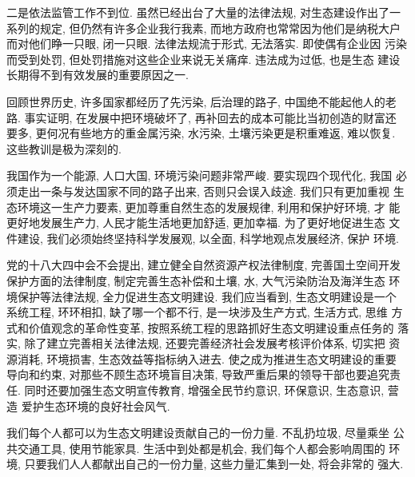 \documentclass[nofonts, a4paper, oneside, 12pt]{article}
\begin{document}
二是依法监管工作不到位. 虽然已经出台了大量的法律法规, 对生态建设作出了一
系列的规定, 但仍然有许多企业我行我素, 而地方政府也常常因为他们是纳税大户
而对他们睁一只眼, 闭一只眼. 法律法规流于形式, 无法落实. 即使偶有企业因
污染而受到处罚, 但处罚措施对这些企业来说无关痛痒. 违法成为过低, 也是生态
建设长期得不到有效发展的重要原因之一.

回顾世界历史, 许多国家都经历了先污染, 后治理的路子, 中国绝不能起他人的老
路. 事实证明, 在发展中把环境破坏了, 再补回去的成本可能比当初创造的财富还
要多, 更何况有些地方的重金属污染, 水污染, 土壤污染更是积重难返, 难以恢复.
这些教训是极为深刻的.

我国作为一个能源, 人口大国, 环境污染问题非常严峻. 要实现四个现代化, 我国 
必须走出一条与发达国家不同的路子出来, 否则只会误入歧途. 我们只有更加重视
生态环境这一生产力要素, 更加尊重自然生态的发展规律, 利用和保护好环境, 才
能更好地发展生产力, 人民才能生活地更加舒适, 更加幸福. 为了更好地促进生态
文件建设, 我们必须始终坚持科学发展观, 以全面, 科学地观点发展经济, 保护
环境. 

党的十八大四中会不会提出, 建立健全自然资源产权法律制度, 完善国土空间开发
保护方面的法律制度, 制定完善生态补偿和土壤, 水, 大气污染防治及海洋生态
环境保护等法律法规, 全力促进生态文明建设. 我们应当看到, 生态文明建设是一个
系统工程, 环环相扣, 缺了哪一个都不行, 是一块涉及生产方式, 生活方式, 思维
方式和价值观念的革命性变革, 按照系统工程的思路抓好生态文明建设重点任务的
落实, 除了建立完善相关法律法规, 还要完善经济社会发展考核评价体系, 切实把
资源消耗, 环境损害, 生态效益等指标纳入进去. 使之成为推进生态文明建设的重要
导向和约束, 对那些不顾生态环境盲目决策, 导致严重后果的领导干部也要追究责任.
同时还要加强生态文明宣传教育, 增强全民节约意识, 环保意识, 生态意识, 营造
爱护生态环境的良好社会风气.

我们每个人都可以为生态文明建设贡献自己的一份力量. 不乱扔垃圾, 尽量乘坐
公共交通工具, 使用节能家具. 生活中到处都是机会, 我们每个人都会影响周围的
环境, 只要我们人人都献出自己的一份力量, 这些力量汇集到一处, 将会非常的
强大.
\end{document}
